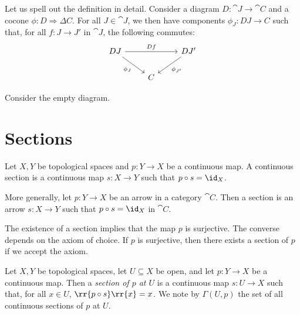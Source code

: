 \documentclass{article}
\begin{document}
Let us spell out the definition in detail. Consider a diagram $D:\cat{J}\to\cat{C}$
and a cocone $\phi:D\Rightarrow\Delta C$. For all $J\in\cat{J}$, we then have
components $\phi_J : DJ \to C$ such that, for all $f:J\to J'$ in $\cat{J}$,
the following commutes:
\begin{equation}
  \begin{tikzcd}
    DJ && {DJ'} \\
       & C
       \arrow["Df", from=1-1, to=1-3]
       \arrow["{\phi_{J'}}", from=1-3, to=2-2]
       \arrow["{\phi_J}"', from=1-1, to=2-2]
  \end{tikzcd}
\end{equation}

\begin{example}
  Consider the empty diagram.
\end{example}

\section{Sections}\label{sec:sections}

\begin{definition}
  Let $X,Y$ be topological spaces and $p:Y\to X$ be a continuous map. A continuous section
  is a continuous map $s:X\to Y$ such that $p \circ s = \id_X$.

  More generally, let $p:Y\to X$ be an arrow in a category $\cat{C}$. Then a section
  is an arrow $s:X\to Y$ such that $p\circ s=\id_X$ in $\cat{C}$.
\end{definition}

\begin{remark}\label{remark:continuity_and_sections}
  The existence of a section implies that the map $p$ is surjective. The converse
  depends on the axiom of choice. If $p$ is surjective, then there exists a section
  of $p$ if we accept the axiom.
\end{remark}

\begin{definition}
  Let $X,Y$ be topological spaces, let $U\subseteq X$ be open, and let $p:Y\to X$ be
  a continuous map. Then a \emph{section of $p$ at $U$} is a continuous map
  $s:U\to X$ such that, for all $x\in U$, $\rr{p\circ s}\rr{x}=x$.
  We note by $\Gamma(U,p)$ the set of all continuous sections of $p$ at $U$.
\end{definition}
\end{document}
